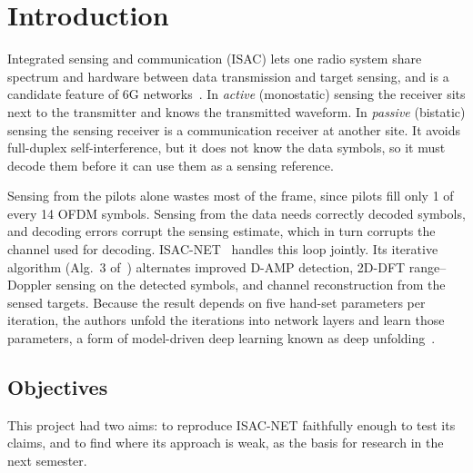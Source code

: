 \documentclass[11pt,a4paper]{article}
\begin{document}
\newpage
\tableofcontents
\newpage

\section{Introduction}
Integrated sensing and communication (ISAC) lets one radio system share spectrum and hardware between data transmission and target sensing, and is a candidate feature of 6G networks~\cite{isacnet,zhang2022}. In \emph{active} (monostatic) sensing the receiver sits next to the transmitter and knows the transmitted waveform. In \emph{passive} (bistatic) sensing the sensing receiver is a communication receiver at another site. It avoids full-duplex self-interference, but it does not know the data symbols, so it must decode them before it can use them as a sensing reference.

Sensing from the pilots alone wastes most of the frame, since pilots fill only 1 of every 14 OFDM symbols. Sensing from the data needs correctly decoded symbols, and decoding errors corrupt the sensing estimate, which in turn corrupts the channel used for decoding. ISAC-NET~\cite{isacnet} handles this loop jointly. Its iterative algorithm (Alg.~3 of~\cite{isacnet}) alternates improved D-AMP detection, 2D-DFT range--Doppler sensing on the detected symbols, and channel reconstruction from the sensed targets. Because the result depends on five hand-set parameters per iteration, the authors unfold the iterations into network layers and learn those parameters, a form of model-driven deep learning known as deep unfolding~\cite{oampnet}.

\subsection{Objectives}
This project had two aims: to reproduce ISAC-NET faithfully enough to test its claims, and to find where its approach is weak, as the basis for research in the next semester.
\end{document}
